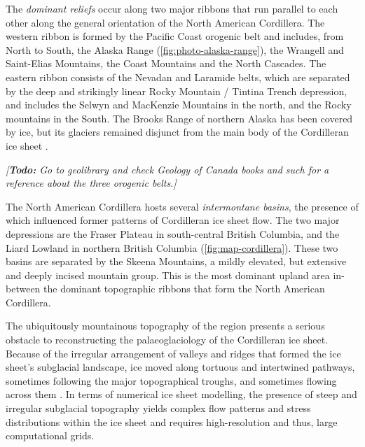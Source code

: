 \documentclass{article}
\newcommand{\todo}[1]{\emph{[\textbf{Todo:} #1]}}
\begin{document}
The \emph{dominant reliefs} occur along two major ribbons that run parallel to
each other along the general orientation of the North American Cordillera. The
western ribbon is formed by the Pacific Coast orogenic belt and includes, from
North to South, the Alaska Range (\cref{fig:photo-alaska-range}), the Wrangell
and Saint-Elias Mountains,
the Coast Mountains and the North Cascades. The eastern ribbon consists of the
Nevadan and Laramide belts, which are separated by the deep and strikingly
linear Rocky Mountain / Tintina Trench depression, and includes the Selwyn and
MacKenzie Mountains in the north, and the Rocky mountains in the South. The
Brooks Range of northern Alaska has been covered by ice, but its glaciers
remained disjunct from the main body of the Cordilleran ice sheet
\citep{Kaufman.Manley.2004}.

\todo{Go to geolibrary and check \emph{Geology of Canada} books and such for a
      reference about the three orogenic belts.}

The North American Cordillera hosts several \emph{intermontane basins}, the
presence
of which influenced former patterns of Cordilleran ice sheet flow. The two
major depressions are the Fraser Plateau in south-central British Columbia, and
the Liard Lowland in northern British Columbia (\cref{fig:map-cordillera}).
These two basins are separated by the Skeena Mountains, a mildly elevated, but
extensive and deeply incised mountain group. This is the most dominant upland
area in-between the dominant topographic ribbons that form the North American
Cordillera.

The ubiquitously mountainous topography of the region presents a serious
obstacle to reconstructing the palaeoglaciology of the Cordilleran ice sheet.
Because of the irregular arrangement of valleys and ridges that formed the ice
sheet's subglacial landscape, ice moved along tortuous and intertwined
pathways, sometimes following the major topographical troughs, and sometimes
flowing across them \citep{Davis.Mathews.1944, Kleman.etal.2010}. In terms of
numerical ice sheet modelling, the presence of steep and irregular subglacial
topography yields complex flow patterns and stress distributions within the ice
sheet and requires high-resolution and thus, large computational grids.
\end{document}
